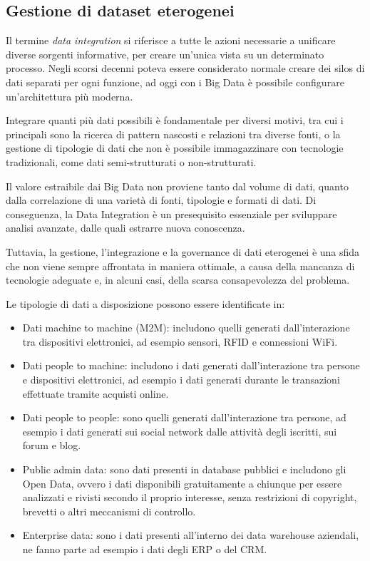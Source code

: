 \subsection{Gestione di dataset eterogenei}
Il termine \textit{data integration} si riferisce a tutte le azioni necessarie a unificare diverse sorgenti informative, per creare un'unica vista su un determinato processo. Negli scorsi decenni poteva essere considerato normale creare dei silos di dati separati per ogni funzione, ad oggi con i Big Data è possibile configurare un'architettura più moderna.

Integrare quanti più dati possibili è fondamentale per diversi motivi, tra cui i principali sono la ricerca di pattern nascosti e relazioni tra diverse fonti, o la gestione di tipologie di dati che non è possibile immagazzinare con tecnologie tradizionali, come dati semi-strutturati o non-strutturati.

Il valore estraibile dai Big Data non proviene tanto dal volume di dati, quanto dalla correlazione di una varietà di fonti, tipologie e formati di dati. Di conseguenza, la Data Integration è un presequisito essenziale per sviluppare analisi avanzate, dalle quali estrarre nuova conoscenza.

Tuttavia, la gestione, l'integrazione e la governance di dati eterogenei è una sfida che non viene sempre affrontata in maniera ottimale, a causa della mancanza di tecnologie adeguate e, in alcuni casi, della scarsa consapevolezza del problema.

Le tipologie di dati a disposizione possono essere identificate in:
\begin{itemize}
    \item Dati machine to machine (M2M): includono quelli generati dall'interazione tra dispositivi elettronici, ad esempio sensori, RFID e connessioni WiFi.
    \item Dati people to machine: includono i dati generati dall'interazione tra persone e dispositivi elettronici, ad esempio i dati generati durante le transazioni effettuate tramite acquisti online.
    \item Dati people to people: sono quelli generati dall'interazione tra persone, ad esempio i dati generati sui social network dalle attività degli iscritti, sui forum e blog.
    \item Public admin data: sono dati presenti in database pubblici e includono gli Open Data, ovvero i dati disponibili gratuitamente a chiunque per essere analizzati e rivisti secondo il proprio interesse, senza restrizioni di copyright, brevetti o altri meccanismi di controllo.
    \item Enterprise data: sono i dati presenti all'interno dei data warehouse aziendali, ne fanno parte ad esempio i dati degli ERP o del CRM.
\end{itemize}


